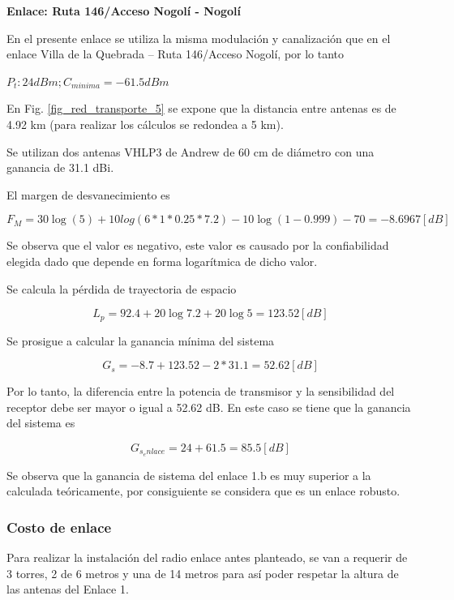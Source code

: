 \documentclass[12pt,a4paper]{book}
\begin{document}
\medskip

\noindent\textbf{Enlace: Ruta 146/Acceso Nogolí - Nogolí}

En el presente enlace se utiliza la misma modulación y canalización que en el enlace Villa de la Quebrada – Ruta 146/Acceso Nogolí, por lo tanto

$P_{t}:24 dBm; C_{minima}=-61.5 dBm$

En Fig. \ref{fig_red_transporte_5} se expone que la distancia entre antenas es de 4.92 km (para realizar los cálculos se redondea a 5 km).

Se utilizan dos antenas VHLP3 de Andrew de 60 cm de diámetro con una ganancia de 31.1 dBi.

El margen de desvanecimiento es

\begin{equation}\label{Barnet_resultado_enlace1_b}
F_{M}= 30 \log(5) + 10 log(6 * 1 *0.25*7.2)- 10 \log(1-0.999) - 70= -8.6967 [dB]
\end{equation}

Se observa que el valor es negativo, este valor es causado por la confiabilidad elegida dado que depende en forma logarítmica de dicho valor.

Se calcula la pérdida de trayectoria de espacio 

\begin{equation}\label{perdida_trayectoria_db_resultado_1b}
L_{p} =92.4 + 20 \log{7.2} + 20 \log{5} = 123.52 [dB]
\end{equation}

Se prosigue a calcular la ganancia mínima del sistema

\begin{equation}
G_{s}=-8.7 + 123.52 - 2 * 31.1 = 52.62[dB]
\end{equation}

Por lo tanto, la diferencia entre la potencia de transmisor y la sensibilidad del receptor debe ser mayor o igual a 52.62 dB. En este caso se tiene que la ganancia del sistema es

\begin{equation}
G_{s_enlace}= 24 + 61.5 = 85.5 [dB]
\end{equation}

Se observa que la ganancia de sistema del enlace 1.b es muy superior a la calculada teóricamente, por consiguiente se considera que es un enlace robusto.

\subsubsection{Costo de enlace}
Para realizar la instalación del radio enlace antes planteado, se van a requerir de 3 torres, 2 de 6 metros y una de 14 metros para así poder respetar la altura de las antenas del Enlace 1. %
\end{document}
